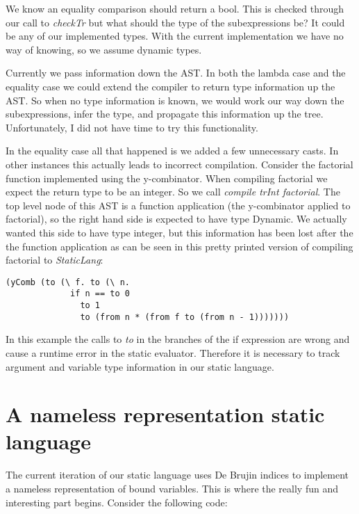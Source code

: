 \documentclass{article}
\begin{document}
We know an equality comparison should return a bool. This is checked through our call to \textit{checkTr} but what should the type of the subexpressions be? It could be any of our implemented types. With the current implementation we have no way of knowing, so we assume dynamic types.


Currently we pass information down the AST. In both the lambda case and the equality case we could extend the compiler to return type information up the AST. So when no type information is known, we would work our way down the subexpressions, infer the type, and propagate this information up the tree. Unfortunately, I did not have time to try this functionality.

In the equality case all that happened is we added a few unnecessary casts. In other instances this actually leads to incorrect compilation. Consider the factorial function implemented using the y-combinator. When compiling factorial we expect the return type to be an integer. So we call \textit{compile trInt factorial}. The top level node of this AST is a function application (the y-combinator applied to factorial), so the right hand side is expected to have type Dynamic. We actually wanted this side to have type integer, but this information has been lost after the the function application as can be seen in this pretty printed version of compiling factorial to \textit{StaticLang}:
\begin{verbatim}
(yComb (to (\ f. to (\ n.
             if n == to 0
               to 1
               to (from n * (from f to (from n - 1)))))))
\end{verbatim}
In this example the calls to \textit{to} in the branches of the if expression are wrong and cause a runtime error in the static evaluator. Therefore it is necessary to track argument and variable type information in our static language.

\section*{A nameless representation static language}
The current iteration of our static language uses De Brujin indices to implement a nameless representation of bound variables. This is where the really fun and interesting part begins. Consider the following code:
\end{document}
